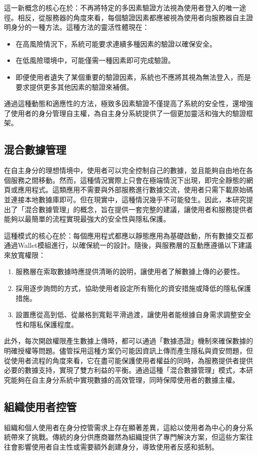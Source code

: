 這一新概念的核心在於：不再將特定的多因素驗證方法視為使用者登入的唯一途徑。相反，從服務器的角度來看，每個驗證因素都應被視為使用者向服務器自主證明身分的一種方法。這種方法的靈活性體現在：
\begin{itemize}
  \item 在高風險情況下，系統可能要求連續多種因素的驗證以確保安全。
  \item 在低風險環境中，可能僅需一種因素即可完成驗證。
  \item 即便使用者遺失了某個重要的驗證因素，系統也不應將其視為無法登入，而是要求提供更多其他因素的驗證來補償。
\end{itemize}
通過這種動態和適應性的方法，極致多因素驗證不僅提高了系統的安全性，還增強了使用者的身分管理自主權，為自主身分系統提供了一個更加靈活和強大的驗證框架。
\subsection{混合數據管理}
在自主身分的理想情境中，使用者可以完全控制自己的數據，並且能夠自由地在各個服務之間移動。然而，這種情況實際上只會在極端情況下出現，即完全靜態的網頁或應用程式。這類應用不需要與外部服務進行數據交流，使用者只需下載原始碼並連接本地數據庫即可。但在現實中，這種情況幾乎不可能發生。因此，本研究提出了「混合數據管理」的概念，旨在提供一套完整的建議，讓使用者和服務提供者能夠以最簡單的流程實現最強大的安全性與隱私保護。

這種模式的核心在於：每個應用程式都應以靜態應用為基礎啟動，所有數據交互都通過Wallet模組進行，以確保統一的設計。隨後，與服務層的互動應遵循以下建議來放寬權限：
\begin{enumerate}
  \item 服務層在索取數據時應提供清晰的說明，讓使用者了解數據上傳的必要性。
  \item 採用逐步詢問的方式，協助使用者設定所有簡化的資安措施或降低的隱私保護措施。
  \item 設置應從高到低、從嚴格到寬鬆平滑過渡，讓使用者能根據自身需求調整安全性和隱私保護程度。
\end{enumerate}
此外，每次開啟權限產生數據上傳時，都可以通過「數據憑證」機制來確保數據的明確授權等問題。儘管採用這種方案仍可能因資訊上傳而產生隱私與資安問題，但從使用者流程的角度來看，它在盡可能保護使用者權益的同時，為服務提供者提供必要的數據支持，實現了雙方利益的平衡。通過這種「混合數據管理」模式，本研究能夠在自主身分系統中實現數據的高效管理，同時保障使用者的數據主權。
\subsection{組織使用者控管}
組織和個人使用者在身分控管需求上存在顯著差異，這給以使用者為中心的身分系統帶來了挑戰。傳統的身分供應商雖然為組織提供了專門解決方案，但這些方案往往會影響使用者自主性或需要額外創建身分，導致使用者反感和抵制。

